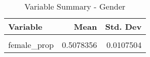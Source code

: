 \begin{table}[H]

\caption{\label{tab:tab:gender}Variable Summary - Gender}
\centering
\begin{tabular}[t]{lrr}
\toprule
Variable & Mean & Std. Dev\\
\midrule
\cellcolor{gray!6}{male\_prop} & \cellcolor{gray!6}{0.4921644} & \cellcolor{gray!6}{0.0107504}\\
female\_prop & 0.5078356 & 0.0107504\\
\bottomrule
\end{tabular}
\end{table}
